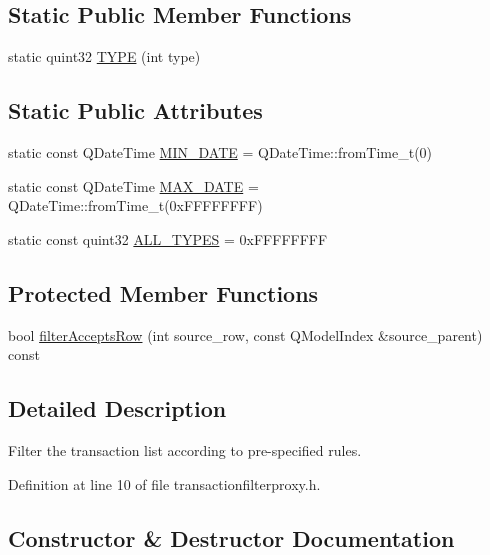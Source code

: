 \subsection*{Static Public Member Functions}
\begin{DoxyCompactItemize}
\item 
static quint32 \hyperlink{class_transaction_filter_proxy_aaacec79a6362b13ee4cfab7f770e33b5}{T\+Y\+P\+E} (int type)
\end{DoxyCompactItemize}
\subsection*{Static Public Attributes}
\begin{DoxyCompactItemize}
\item 
static const Q\+Date\+Time \hyperlink{class_transaction_filter_proxy_aac7bf4c1105641b19eb6f7c8741b502e}{M\+I\+N\+\_\+\+D\+A\+T\+E} = Q\+Date\+Time\+::from\+Time\+\_\+t(0)
\item 
static const Q\+Date\+Time \hyperlink{class_transaction_filter_proxy_a5ac7f4d41a56e44f4cc74ebeffb5a254}{M\+A\+X\+\_\+\+D\+A\+T\+E} = Q\+Date\+Time\+::from\+Time\+\_\+t(0x\+F\+F\+F\+F\+F\+F\+F\+F)
\item 
static const quint32 \hyperlink{class_transaction_filter_proxy_a845c1358f6cc8e60b6fae4725d2fc03f}{A\+L\+L\+\_\+\+T\+Y\+P\+E\+S} = 0x\+F\+F\+F\+F\+F\+F\+F\+F
\end{DoxyCompactItemize}
\subsection*{Protected Member Functions}
\begin{DoxyCompactItemize}
\item 
bool \hyperlink{class_transaction_filter_proxy_afbe3427b446cb54b4e2e85cb43500308}{filter\+Accepts\+Row} (int source\+\_\+row, const Q\+Model\+Index \&source\+\_\+parent) const 
\end{DoxyCompactItemize}


\subsection{Detailed Description}
Filter the transaction list according to pre-\/specified rules. 

Definition at line 10 of file transactionfilterproxy.\+h.



\subsection{Constructor \& Destructor Documentation}
\hypertarget{class_transaction_filter_proxy_a9981e03a2b60931e3e5adbe7e3fb6b7d}{}
